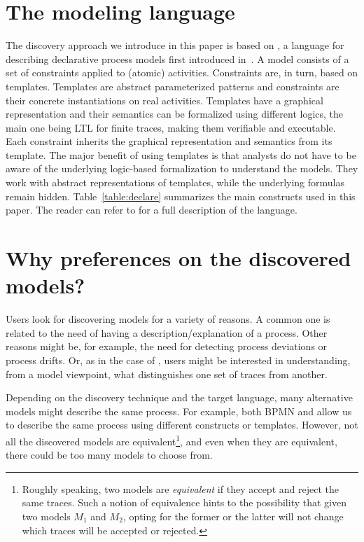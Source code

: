
\section{The modeling language}
\label{sec:prel}
The discovery approach we introduce in this paper is based on \declare, a language for describing declarative process models first introduced
in~\cite{DBLP:conf/edoc/PesicSA07}. A \declare model consists of a set of constraints applied to
(atomic) activities. Constraints are, in turn, based on templates. Templates are
abstract parameterized patterns and constraints are their concrete
instantiations on real activities.
Templates have a graphical representation and their semantics can be formalized using different logics, the main one being  LTL for finite traces, making them verifiable and executable.
Each constraint inherits the graphical representation and semantics from its
template.
The major benefit of using templates is that analysts do not have to be aware of
the underlying logic-based formalization to understand the models. They work
with abstract representations of templates, while the underlying formulas
remain hidden. Table~\ref{table:declare} summarizes the main \declare constructs used in this paper. The reader can refer to \cite{DBLP:conf/edoc/PesicSA07} for a full description
of the language.





\section{Why preferences on the discovered models?}
\label{sec:example}


Users look for discovering models for a variety of reasons. A common one is related to the need of having a description/explanation of a process. Other reasons might be, for example, the need for detecting process deviations or process drifts. Or, as in the case of \nd,  users might be interested in understanding, from a model viewpoint, what distinguishes one set of traces from another. 

Depending on the discovery technique and the target language, many alternative models might describe the same process. For example, both BPMN and \declare allow us to describe the same process using different constructs or templates. However, not all the discovered models are equivalent\footnote{Roughly speaking, two models are \emph{equivalent} if they accept and reject the same traces. Such a notion of equivalence hints to the possibility that given two models $M_1$ and $M_2$, %
opting for the former or the latter will not change which traces will be accepted or rejected.}, and even when they are equivalent, there could be too many models to choose from.

